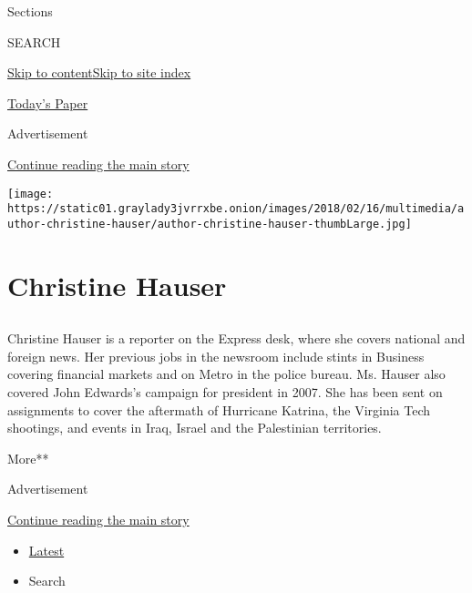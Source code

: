 Sections

SEARCH

\protect\hyperlink{site-content}{Skip to
content}\protect\hyperlink{site-index}{Skip to site index}

\href{https://myaccount.nytimes3xbfgragh.onion/auth/login?response_type=cookie\&client_id=vi}{}

\href{https://www.nytimes3xbfgragh.onion/section/todayspaper}{Today's
Paper}

Advertisement

\protect\hyperlink{after-top}{Continue reading the main story}

\texttt{[image: https://static01.graylady3jvrrxbe.onion/images/2018/02/16/multimedia/author-christine-hauser/author-christine-hauser-thumbLarge.jpg]}

\hypertarget{christine-hauser}{%
\section{Christine Hauser}\label{christine-hauser}}

\subsection{}

Christine Hauser is a reporter on the Express desk, where she covers
national and foreign news. Her previous jobs in the newsroom include
stints in Business covering financial markets and on Metro in the police
bureau. Ms. Hauser also covered John Edwards's campaign for president in
2007. She has been sent on assignments to cover the aftermath of
Hurricane Katrina, the Virginia Tech shootings, and events in Iraq,
Israel and the Palestinian territories.

More**

Advertisement

\protect\hyperlink{after-mid1}{Continue reading the main story}

\begin{itemize}
\tightlist
\item
  \protect\hyperlink{stream-panel}{Latest}
\item
  Search
\end{itemize}

